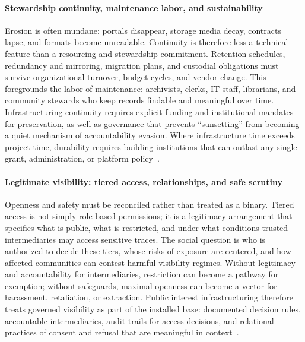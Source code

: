 \documentclass[acmsmall,screen]{acmart}
\begin{document}
\paragraph*{Stewardship continuity, maintenance labor, and sustainability}
Erosion is often mundane: portals disappear, storage media decay, contracts lapse, and formats become unreadable. Continuity is therefore less a technical feature than a resourcing and stewardship commitment. Retention schedules, redundancy and mirroring, migration plans, and custodial obligations must survive organizational turnover, budget cycles, and vendor change. This foregrounds the labor of maintenance: archivists, clerks, IT staff, librarians, and community stewards who keep records findable and meaningful over time. Infrastructuring continuity requires explicit funding and institutional mandates for preservation, as well as governance that prevents ``sunsetting'' from becoming a quiet mechanism of accountability evasion. Where infrastructure time exceeds project time, durability requires building institutions that can outlast any single grant, administration, or platform policy~\cite{karastiStudyingInfrastructuringEthnographically2018a,gaffney_caveat_2018,baumgartner_incompleteness_2018}.

\paragraph*{Legitimate visibility: tiered access, relationships, and safe scrutiny}
Openness and safety must be reconciled rather than treated as a binary. Tiered access is not simply role-based permissions; it is a legitimacy arrangement that specifies what is public, what is restricted, and under what conditions trusted intermediaries may access sensitive traces. The social question is who is authorized to decide these tiers, whose risks of exposure are centered, and how affected communities can contest harmful visibility regimes. Without legitimacy and accountability for intermediaries, restriction can become a pathway for exemption; without safeguards, maximal openness can become a vector for harassment, retaliation, or extraction. Public interest infrastructuring therefore treats governed visibility as part of the installed base: documented decision rules, accountable intermediaries, audit trails for access decisions, and relational practices of consent and refusal that are meaningful in context~\cite{gibney_PrivacyHurdlesThwart_2019,Mervis_Privacyconcernscould_2019,khatri_governance_2010}.
\end{document}
